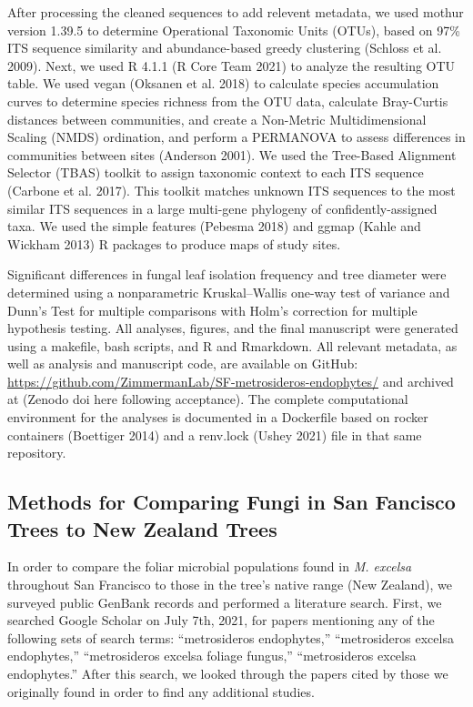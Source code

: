 \documentclass[fleqn,10pt,lineno]{wlpeerj} %
\begin{document}
After processing the cleaned sequences to add relevent metadata, we used mothur version 1.39.5 to determine Operational Taxonomic Units (OTUs), based on 97\% ITS sequence similarity and abundance-based greedy clustering (Schloss et al. 2009). Next, we used R 4.1.1 (R Core Team 2021) to analyze the resulting OTU table. We used vegan (Oksanen et al. 2018) to calculate species accumulation curves to determine species richness from the OTU data, calculate Bray-Curtis distances between communities, and create a Non-Metric Multidimensional Scaling (NMDS) ordination, and perform a PERMANOVA to assess differences in communities between sites (Anderson 2001). We used the Tree-Based Alignment Selector (TBAS) toolkit to assign taxonomic context to each ITS sequence (Carbone et al. 2017). This toolkit matches unknown ITS sequences to the most similar ITS sequences in a large multi-gene phylogeny of confidently-assigned taxa. We used the simple features (Pebesma 2018) and ggmap (Kahle and Wickham 2013) R packages to produce maps of study sites.

Significant differences in fungal leaf isolation frequency and tree diameter were determined using a nonparametric Kruskal--Wallis one-way test of variance and Dunn's Test for multiple comparisons with Holm's correction for multiple hypothesis testing. All analyses, figures, and the final manuscript were generated using a makefile, bash scripts, and R and Rmarkdown. All relevant metadata, as well as analysis and manuscript code, are available on GitHub: \url{https://github.com/ZimmermanLab/SF-metrosideros-endophytes/} and archived at (Zenodo doi here following acceptance). The complete computational environment for the analyses is documented in a Dockerfile based on rocker containers (Boettiger 2014) and a renv.lock (Ushey 2021) file in that same repository.

\hypertarget{methods-for-comparing-fungi-in-san-fancisco-trees-to-new-zealand-trees}{%
\subsection*{Methods for Comparing Fungi in San Fancisco Trees to New Zealand Trees}\label{methods-for-comparing-fungi-in-san-fancisco-trees-to-new-zealand-trees}}

In order to compare the foliar microbial populations found in \emph{M. excelsa} throughout San Francisco to those in the tree's native range (New Zealand), we surveyed public GenBank records and performed a literature search. First, we searched Google Scholar on July 7th, 2021, for papers mentioning any of the following sets of search terms: ``metrosideros endophytes,'' ``metrosideros excelsa endophytes,'' ``metrosideros excelsa foliage fungus,'' ``metrosideros excelsa endophytes.'' After this search, we looked through the papers cited by those we originally found in order to find any additional studies.
\end{document}

